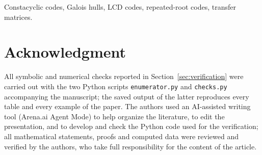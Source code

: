 \documentclass[journal,peerreview]{IEEEtran}
\theoremstyle{definition}
\theoremstyle{remark}
\begin{document}
\begin{IEEEkeywords}
Constacyclic codes, Galois hulls, LCD codes, repeated-root codes, transfer
matrices.
\end{IEEEkeywords}



\section*{Acknowledgment}
All symbolic and numerical checks reported in Section~\ref{sec:verification}
were carried out with the two Python scripts \texttt{enumerator.py} and
\texttt{checks.py} accompanying the manuscript; the saved output of the latter
reproduces every table and every example of the paper.
The authors used an AI-assisted writing tool (Arena.ai Agent Mode) to help
organize the literature, to edit the presentation, and to develop and check the
Python code used for the verification; all mathematical statements, proofs and
computed data were reviewed and verified by the authors, who take full
responsibility for the content of the article.



\end{document}
